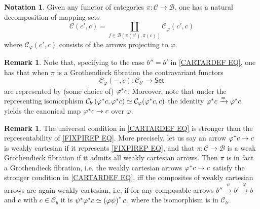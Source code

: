 \documentclass[a4paper,10pt
,draft
]{article}%
\numberwithin{equation}{section}
\numberwithin{figure}{section}
\theoremstyle{definition} %
\newtheorem{remark}[equation]{Remark}%
\newtheorem{notation}[equation]{Notation}%
\newcommand{\1}{\ensuremath{\mathbbm 1}}%
\begin{document}
\begin{notation}\label{MAPSDEC NOT}
Given any functor of categories
$\pi \colon \mathcal{C} \to \mathcal{B}$,
one has a natural decomposition of mapping sets
\begin{equation}
\mathcal{C}(c',c) = 
\coprod_{f \in \mathcal{B}(\pi(c'),\pi(c))}
 \mathcal{C}_{\varphi}\left(c',c \right)
\end{equation}
where $\mathcal{C}_{\varphi}\left(c',c \right)$ consists of the arrows projecting to $\varphi$.
\end{notation}



\begin{remark}\label{CARTCHAR REM}
Note that, specifying to the case $b'' = b'$ in 
\eqref{CARTARDEF EQ},
one has that when $\pi$ is a Grothendieck fibration the contravariant functors
\begin{equation}\label{FIXPIREP EQ}
\mathcal{C}_{\varphi}(-,c)
\colon
\mathcal{C}_{b'} 
\to
\mathsf{Set}
\end{equation}
are represented by (some choice of) $\varphi^{\**}c$.
Moreover, note that under the representing isomorphism
$\mathcal{C}_{b'}(\varphi^{\**}c,\varphi^{\**}c)
\simeq \mathcal{C}_{\varphi}(\varphi^{\**}c,c)$
the identity
$\varphi^{\**}c \xrightarrow{=} \varphi^{\**}c$
yields the canonical map
$\varphi^{\**}c \to c$ over $\varphi$.
\end{remark}


\begin{remark}\label{COMPSEMI REM}
The universal condition in \eqref{CARTARDEF EQ}
is stronger than the representability of 
\eqref{FIXPIREP EQ}.
More precisely, let us say an arrow 
$\varphi^{\**}c \to c$
is weakly cartesian if it represents \eqref{FIXPIREP EQ},
and that  
$\pi \colon \mathcal{C} \to \mathcal{B}$
is a weak Grothendieck fibration if it admits all weakly cartesian arrows.
Then $\pi$ is in fact a Grothendieck fibration,
i.e. the weakly cartesian arrows 
$\varphi^{\**}c \to c$
satisfy the stronger condition in \eqref{CARTARDEF EQ},
iff the composites of weakly cartesian arrows are again weakly cartesian, 
i.e. if 
for any composable arrows
$b'' \xrightarrow{\psi} b' \xrightarrow{\varphi} b$
and $c$ with $c \in \mathcal{C}_b$ it is
$\psi^{\**} \varphi^{\**} c \simeq 
\left( \varphi \psi \right)^{\**} c$,
where the isomorphism is in $\mathcal{C}_b$.
\end{remark}
\end{document}
